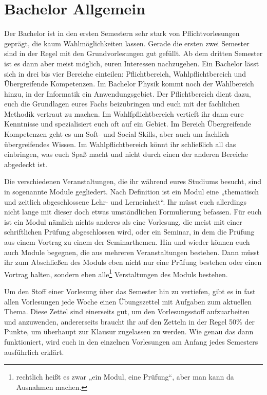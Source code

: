 \section{Bachelor Allgemein}
Der Bachelor ist in den ersten Semestern sehr stark von Pflichtvorlesungen
geprägt, die kaum Wahlmöglichkeiten lassen. Gerade die ersten zwei Semester
sind in der Regel mit den Grundvorlesungen gut gefüllt. Ab dem dritten Semester
ist es dann aber meist möglich, euren Interessen nachzugehen.
Ein Bachelor lässt sich in drei bis vier Bereiche einteilen: Pflichtbereich,
Wahlpflichtbereich und Übergreifende Kompetenzen. Im Bachelor Physik kommt noch
der Wahlbereich hinzu, in der Informatik ein Anwendungsgebiet.
Der Pflichtbereich dient dazu, euch die Grundlagen eures Fachs beizubringen und
euch mit der fachlichen Methodik vertraut zu machen.  Im Wahlfpflichtbereich
vertieft ihr dann eure Kenntnisse und spezialisiert euch oft auf ein Gebiet. Im
Bereich Übergreifende Kompetenzen geht es um Soft- und Social Skills, aber auch
um fachlich übergreifendes Wissen.  Im Wahlpflichtbereich könnt ihr
schließlich all das einbringen, was euch Spaß macht und nicht durch einen der
anderen Bereiche abgedeckt ist.

Die verschiedenen Veranstaltungen, die ihr während eures Studiums besucht, sind
in sogenannte Module gegliedert. Nach Definition ist ein Modul eine „thematisch
und zeitlich abgeschlossene Lehr- und Lerneinheit“. Ihr müsst euch allerdings
nicht lange mit dieser doch etwas umständlichen Formulierung befassen. Für euch
ist ein Modul nämlich nichts anderes als eine Vorlesung, die meist mit einer
schriftlichen Prüfung abgeschlossen wird, oder ein Seminar, in dem die Prüfung
aus einem Vortrag zu einem der Seminarthemen. Hin und wieder können euch auch
Module begegnen, die aus mehreren Veranstaltungen bestehen. Dann müsst ihr zum
Abschließen des Moduls eben nicht nur eine Prüfung bestehen oder einen Vortrag
halten, sondern eben alle\footnote{rechtlich heißt es zwar „ein Modul, eine
Prüfung“, aber man kann da Ausnahmen machen.} Verstaltungen des Moduls bestehen.

Um den Stoff einer Vorlesung über das Semester hin zu vertiefen, gibt es in
fast allen Vorlesungen jede Woche einen Übungszettel mit Aufgaben zum aktuellen
Thema. Diese Zettel sind einerseits gut, um den Vorlesungsstoff aufzuarbeiten
und anzuwenden, andererseits braucht ihr auf den Zetteln in der Regel 50\% der
Punkte, um überhaupt zur Klausur zugelassen zu werden. Wie genau das dann
funktioniert, wird euch in den einzelnen Vorlesungen am Anfang jedes Semesters
ausführlich erklärt.

